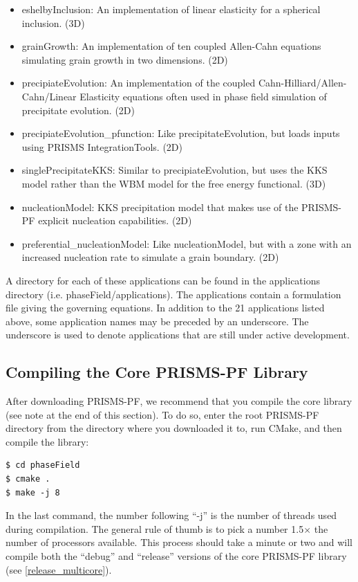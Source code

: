 \documentclass[10pt]{article} %
\begin{document}
\begin{itemize}
\item eshelbyInclusion: An implementation of linear elasticity for a spherical inclusion. (3D)
\item grainGrowth: An implementation of ten coupled Allen-Cahn equations simulating grain growth in two dimensions. (2D)
\item precipiateEvolution: An implementation of the coupled Cahn-Hilliard/Allen-Cahn/Linear Elasticity equations often used in phase field simulation of precipitate evolution. (2D)
\item precipiateEvolution\_pfunction: Like precipitateEvolution, but loads inputs using PRISMS IntegrationTools. (2D)
\item singlePrecipitateKKS: Similar to precipiateEvolution, but uses the KKS model rather than the WBM model for the free energy functional. (3D)
\item nucleationModel: KKS precipitation model that makes use of the PRISMS-PF explicit nucleation capabilities. (2D)
\item preferential\_nucleationModel: Like nucleationModel, but with a zone with an increased nucleation rate to simulate a grain boundary. (2D)
\end{itemize}

A directory for each of these applications can be found in the applications directory (i.e. phaseField/applications). The applications contain a formulation file giving the governing equations. In addition to the 21 applications listed above, some application names may be preceded by an underscore. The underscore is used to denote applications that are still under active development.

\subsection{Compiling the Core PRISMS-PF Library}
After downloading PRISMS-PF, we recommend that you compile the core library (see note at the end of this section). To do so, enter the root PRISMS-PF directory from the directory where you downloaded it to, run CMake, and then compile the library:
\begin{lstlisting}
$ cd phaseField 
$ cmake .
$ make -j 8 
\end{lstlisting}
In the last command, the number following ``-j'' is the number of threads used during compilation. The general rule of thumb is to pick a number 1.5$\times$ the number of processors available. This process should take a minute or two and will compile both the ``debug'' and ``release'' versions of the core PRISMS-PF library (see \ref{release_multicore}).
\end{document}
